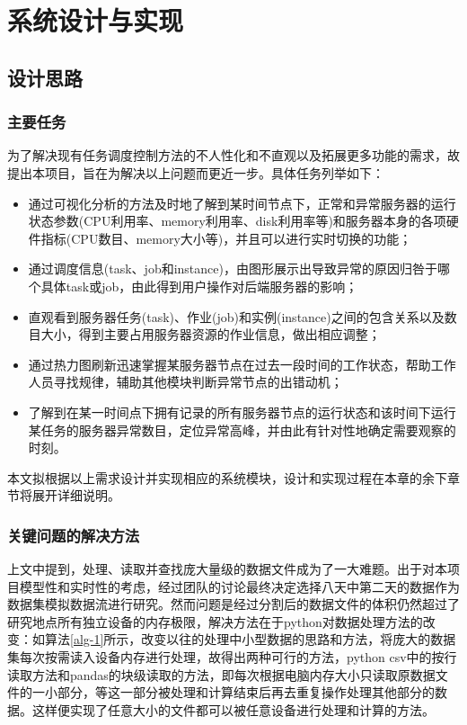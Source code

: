 
\chapter{系统设计与实现}
\section{设计思路}
\subsection{主要任务}

为了解决现有任务调度控制方法的不人性化和不直观以及拓展更多功能的需求，故提出本项目，旨在为解决以上问题而更近一步。具体任务列举如下：

\begin{itemize}
	\item 通过可视化分析的方法及时地了解到某时间节点下，正常和异常服务器的运行状态参数(CPU利用率、memory利用率、disk利用率等)和服务器本身的各项硬件指标(CPU数目、memory大小等)，并且可以进行实时切换的功能；
	\item 通过调度信息(task、job和instance)，由图形展示出导致异常的原因归咎于哪个具体task或job，由此得到用户操作对后端服务器的影响；
	\item 直观看到服务器任务(task)、作业(job)和实例(instance)之间的包含关系以及数目大小，得到主要占用服务器资源的作业信息，做出相应调整；
	\item 通过热力图刷新迅速掌握某服务器节点在过去一段时间的工作状态，帮助工作人员寻找规律，辅助其他模块判断异常节点的出错动机；
	\item 了解到在某一时间点下拥有记录的所有服务器节点的运行状态和该时间下运行某任务的服务器异常数目，定位异常高峰，并由此有针对性地确定需要观察的时刻。
\end{itemize}

本文拟根据以上需求设计并实现相应的系统模块，设计和实现过程在本章的余下章节将展开详细说明。

\subsection{关键问题的解决方法}


上文中提到，处理、读取并查找庞大量级的数据文件成为了一大难题。出于对本项目模型性和实时性的考虑，经过团队的讨论最终决定选择八天中第二天的数据作为数据集模拟数据流进行研究。然而问题是经过分割后的数据文件的体积仍然超过了研究地点所有独立设备的内存极限，解决方法在于python对数据处理方法的改变：如算法\ref{alg-1}所示，改变以往的处理中小型数据的思路和方法，将庞大的数据集每次按需读入设备内存进行处理，故得出两种可行的方法，python csv中的按行读取方法和pandas的块级读取的方法，即每次根据电脑内存大小只读取原数据文件的一小部分，等这一部分被处理和计算结束后再去重复操作处理其他部分的数据。这样便实现了任意大小的文件都可以被任意设备进行处理和计算的方法。

